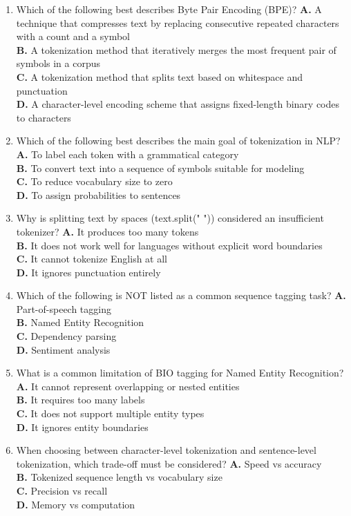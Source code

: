 \documentclass[11pt]{article}
\begin{document}
\begin{enumerate}[label=Q\arabic*., leftmargin=*]
\item Which of the following best describes Byte Pair Encoding (BPE)?
\textbf{A.} A technique that compresses text by replacing consecutive repeated characters with a count and a symbol\\
\textbf{B.} A tokenization method that iteratively merges the most frequent pair of symbols in a corpus\\
\textbf{C.} A tokenization method that splits text based on whitespace and punctuation\\
\textbf{D.} A character-level encoding scheme that assigns fixed-length binary codes to characters

\item Which of the following best describes the main goal of tokenization in NLP?
\textbf{A.} To label each token with a grammatical category\\
\textbf{B.} To convert text into a sequence of symbols suitable for modeling\\
\textbf{C.} To reduce vocabulary size to zero\\
\textbf{D.} To assign probabilities to sentences

\item Why is splitting text by spaces (text.split(" ")) considered an insufficient tokenizer?
\textbf{A.} It produces too many tokens\\
\textbf{B.} It does not work well for languages without explicit word boundaries\\
\textbf{C.} It cannot tokenize English at all\\
\textbf{D.} It ignores punctuation entirely

\item Which of the following is NOT listed as a common sequence tagging task?
\textbf{A.} Part-of-speech tagging\\
\textbf{B.} Named Entity Recognition\\
\textbf{C.} Dependency parsing\\
\textbf{D.} Sentiment analysis

\item What is a common limitation of BIO tagging for Named Entity Recognition?
\textbf{A.} It cannot represent overlapping or nested entities\\
\textbf{B.} It requires too many labels\\
\textbf{C.} It does not support multiple entity types\\
\textbf{D.} It ignores entity boundaries

\item When choosing between character-level tokenization and sentence-level tokenization, which trade-off must be considered?
\textbf{A.} Speed vs accuracy\\
\textbf{B.} Tokenized sequence length vs vocabulary size\\
\textbf{C.} Precision vs recall\\
\textbf{D.} Memory vs computation

\end{enumerate}
\end{document}
